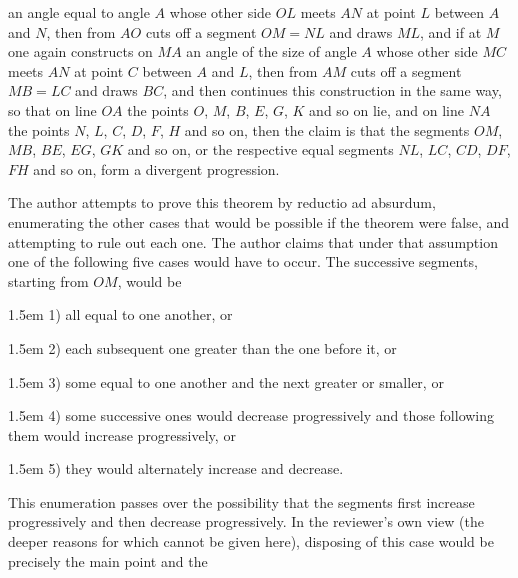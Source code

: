 \par\noindent
\begin{minipage}[t]{.38\textwidth}
\vspace{0pt}
\centering

\end{minipage}\hfill
\begin{minipage}[t]{.58\textwidth}
\vspace{0pt}
an angle equal to angle $A$ whose other side $OL$ meets $AN$ at
point $L$ between $A$ and $N$, then from $AO$ cuts off a segment $OM=NL$ and
draws $ML$, and if at $M$ one again constructs on $MA$ an angle of the size of angle
$A$ whose other side $MC$ meets $AN$ at point $C$ between $A$ and $L$,
then from $AM$ cuts off a segment $MB=LC$ and draws $BC$, and then continues this
construction in the same way, so that on line $OA$ the points $O$, $M$,
$B$, $E$, $G$, $K$ and so on lie, and on line $NA$ the points $N$, $L$, $C$, $D$,
$F$, $H$ and so on, then the claim is that the segments $OM$, $MB$, $BE$, $EG$, $GK$
and so on, or the respective equal segments $NL$, $LC$, $CD$, $DF$, $FH$ and so on, form a
divergent progression.
\end{minipage}

\medskip
The author attempts to prove this theorem by reductio ad absurdum, enumerating the other
cases that would be possible if the theorem were false, and attempting to rule out each
one. The author claims that under that assumption one of the
following five cases would have to occur. The successive segments, starting from $OM$,
would be


\par\hangindent1.5em 1) all equal to one another, or
\par\hangindent1.5em 2) each subsequent one greater than the one before it, or
\par\hangindent1.5em 3) some equal to one another and the next greater or smaller, or
\par\hangindent1.5em 4) some successive ones would decrease progressively and those following them
would increase progressively, or
\par\hangindent1.5em 5) they would alternately increase and decrease.


This enumeration passes over the possibility that the segments first increase progressively
and then decrease progressively. In the reviewer's own view (the deeper reasons for which
cannot be given here), disposing of this case would be precisely the main point
and the\space%
